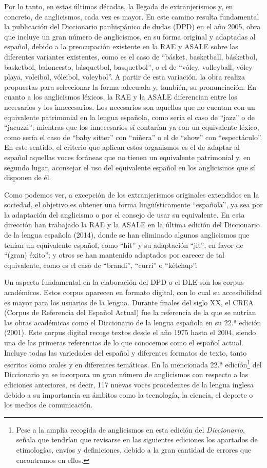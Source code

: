 \documentclass{textolivre}
\begin{document}
Por lo tanto, en estas últimas décadas, la llegada de extranjerismos y, en concreto, de anglicismos, cada vez es mayor. En este camino resulta fundamental la publicación del Diccionario panhispánico de dudas (DPD) en el año 2005, obra que incluye un gran número de anglicismos, en su forma original y adaptadas al español, debido a la preocupación existente en la RAE y ASALE sobre las diferentes variantes existentes, como es el caso de “básket, basketball, básketbol, basketbol, baloncesto, básquetbol, basquetbol”, o el de “vóley, volleyball, vóley-playa, voleibol, vóleibol, voleybol”. A partir de esta variación, la obra realiza propuestas para seleccionar la forma adecuada y, también, su pronunciación. En cuanto a los anglicismos léxicos, la RAE y la ASALE diferencian entre los necesarios y los innecesarios. Los necesarios son aquellos que no cuentan con un equivalente patrimonial en la lengua española, como sería el caso de “jazz” o de “jacuzzi”; mientras que los innecesarios sí contarían ya con un equivalente léxico, como sería el caso de “baby sitter” con “niñera” o el de “show” con “espectáculo”. En este sentido, el criterio que aplican estos organismos es el de adaptar al español aquellas voces foráneas que no tienen un equivalente patrimonial y, en segundo lugar, aconsejar el uso del equivalente español en los anglicismos que sí disponen de él.

Como podemos ver, a excepción de los extranjerismos originales extendidos en la sociedad, el objetivo es obtener una forma lingüísticamente “española”, ya sea por la adaptación del anglicismo o por el consejo de usar su equivalente. En esta dirección han trabajado la RAE y la ASALE en la última edición del Diccionario de la lengua española (2014), donde se han eliminado algunos anglicismos que tenían un equivalente español, como “hit” y su adaptación “jit”, en favor de “(gran) éxito”; y otros se han mantenido adaptados por carecer de tal equivalente, como es el caso de “brandi”, “curri” o “kétchup”.

Un aspecto fundamental en la elaboración del DPD o el DLE son los corpus académicos. Estos corpus aparecen en formato digital, con lo cual su accesibilidad es mayor para los usuarios de la lengua. Durante finales del siglo XX, el CREA (Corpus de Referencia del Español Actual) fue la referencia de la que se nutrían las obras académicas como el Diccionario de la lengua española en su 22.ª edición (2001). Este corpus digital recoge textos desde el año 1975 hasta el 2004, siendo una de las primeras referencias de lo que conocemos como el español actual. Incluye todas las variedades del español y diferentes formatos de texto, tanto escritos como orales y en diferentes temáticas. En la mencionada 22.ª edición\footnote{
Pese a la amplia recogida de anglicismos en esta edición del \emph{Diccionario}, \textcite{mejias2002} señala que tendrían que revisarse en las siguientes ediciones los apartados de etimologías, envíos y definiciones, debido a la gran cantidad de errores que encontramos en ellos.
} del Diccionario ya se incorpora un gran número de anglicismos con respecto a las ediciones anteriores, es decir, 117 nuevas voces procedentes de la lengua inglesa debido a su importancia en ámbitos como la tecnología, la ciencia, el deporte o los medios de comunicación. 
\end{document}
